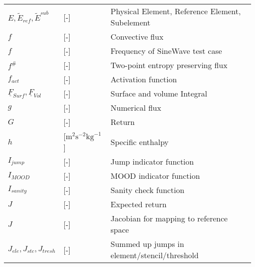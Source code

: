 \begin{tabular}{lll}
     $E, \tilde{E}_{ref}, \tilde{E}^{sub}$              & [-]             & Physical Element, Reference Element, Subelement \\
   \vspace{1mm}
     $f$              & [-]             & Convective flux \\
     \vspace{1mm}
     $f$              & [-]             & Frequency of SineWave test case \\
     \vspace{1mm}   
    $f^\#$              & [-]             & Two-point entropy preserving flux\\  
   \vspace{1mm}
      $f_{act}$              & [-]             & Activation function\\     
   \vspace{1mm}
   $\underline{F}_{Surf},\underline{F}_{Vol}$              & [-]             & Surface and volume Integral\\  
   \vspace{1mm}
      $g$              & [-]             & 
Numerical flux\\
   \vspace{1mm}
   $G$              & [-]             & Return\\ 
   \vspace{1mm}      
  $h$              & [$\text{m}^2\text{s}^{-2}\text{kg}^{-1}$]             & Specific enthalpy \\  
    \vspace{1mm}
   $I_{jump}$              & [-]             & Jump indicator function\\ 
       \vspace{1mm}
   $I_{MOOD}$              & [-]             & MOOD indicator function\\      
     \vspace{1mm}
   $I_{sanity}$              & [-]             & Sanity check function\\    
  \vspace{1mm}
   $J$              & [-]             & Expected return\\ 
   \vspace{1mm}
   $J$              & [-]             & Jacobian for mapping to reference space\\    
   \vspace{1mm}
   $J_{ele},J_{stc},J_{tresh}$              & [-]             & Summed up jumps in element/stencil/threshold \\ 

\end{tabular}
